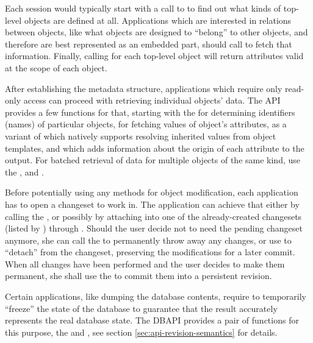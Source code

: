\documentclass{article}
\begin{document}
Each session would typically start with a call to  to find out what kinds of top-level objects
are defined at all.  Applications which are interested in relations between objects, like what objects are designed to
``belong'' to other objects, and therefore are best represented as an embedded part, should call
 to fetch that information.  Finally, calling  for each
top-level object will return attributes valid at the scope of each object.

After establishing the metadata structure, applications which require only read-only access can proceed with retrieving
individual objects' data.  The API provides a few functions for that, starting with the  for
determining identifiers (names) of particular objects,  for fetching values of object's
attributes,  as a variant of  which natively supports
resolving inherited values from object templates, and  which adds information
about the origin of each attribute to the output.  For batched retrieval of data for multiple objects of the same kind,
use the ,  and
.

Before potentially using any methods for object modification, each application has to open a changeset to work in.  The
application can achieve that either by calling the , or possibly by attaching into one of
the already-created changesets (listed by ) through .
Should the user decide not to need the pending changeset anymore, she can call the 
to permanently throw away any changes, or use  to ``detach'' from the
changeset, preserving the modifications for a later commit.  When all changes have been performed and the user decides to
make them permanent, she shall use the  to commit them into a persistent revision.

Certain applications, like dumping the database contents, require to temporarily ``freeze'' the state of the database to
guarantee that the result accurately represents the real database state.  The DBAPI provides a pair of functions for
this purpose, the  and , see section
\ref{sec:api-revision-semantics} for details.
\end{document}
